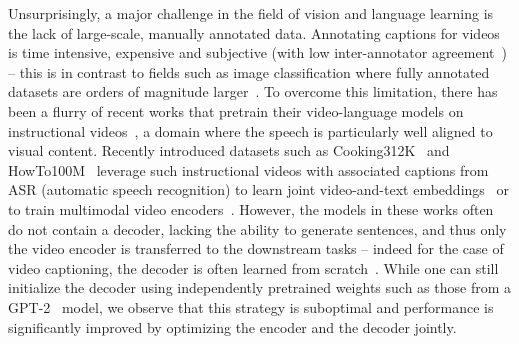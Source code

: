 \documentclass[10pt,twocolumn,letterpaper]{article}
\begin{document}
Unsurprisingly, a major challenge in the field of vision and language learning is the lack of large-scale, manually annotated data. Annotating captions for videos is time intensive, expensive and subjective (with low inter-annotator agreement~\cite{huang2020multimodal}) -- this is in contrast to fields such as image classification where fully annotated datasets are orders of magnitude larger~\cite{ILSVRC15,hinton2015distilling,yalniz2019billion}. 
To overcome this limitation, there has been a flurry of recent works that pretrain their video-language models on instructional videos~\cite{sun2019videobert,sun2019learning,miech2020end,luo2020univl,seo2021look}, a domain where the speech is particularly well aligned to visual content.
Recently introduced datasets such as Cooking312K~\cite{sun2019videobert} and HowTo100M~\cite{miech2019howto100m} leverage such instructional videos with associated captions from ASR (automatic speech recognition) to learn joint video-and-text embeddings~\cite{sun2019learning,miech2020end} or to train multimodal video encoders~\cite{li2020hero,seo2021look}.
However, the models in these works often do not contain a decoder, lacking the ability to generate sentences, and thus only the video encoder is transferred to the downstream tasks -- indeed for the case of video captioning, the decoder is often learned from scratch~\cite{tang2021decembert,sun2019videobert,zhu2020actbert}.
While one can still initialize the decoder using independently pretrained weights such as those from a GPT-2~\cite{radford2019language} model, we observe that this strategy is suboptimal and performance is significantly improved by optimizing the encoder and the decoder jointly.
\end{document}

